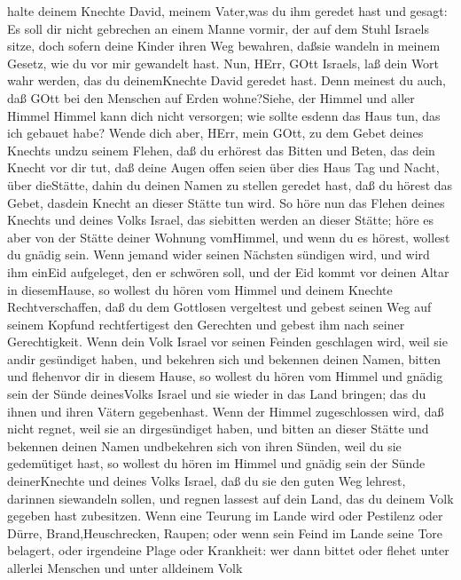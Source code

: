 halte deinem Knechte David, meinem Vater,was du ihm geredet hast und
gesagt: Es soll dir nicht gebrechen an einem Manne vormir, der auf dem
Stuhl Israels sitze, doch sofern deine Kinder ihren Weg bewahren, daßsie
wandeln in meinem Gesetz, wie du vor mir gewandelt hast. 
Nun, HErr, GOtt Israels, laß dein Wort wahr werden, das du deinemKnechte
David geredet hast.  Denn meinest du auch, daß GOtt bei den
Menschen auf Erden wohne?Siehe, der Himmel und aller Himmel Himmel kann
dich nicht versorgen; wie sollte esdenn das Haus tun, das ich gebauet
habe?  Wende dich aber, HErr, mein GOtt, zu dem Gebet
deines Knechts undzu seinem Flehen, daß du erhörest das Bitten und
Beten, das dein Knecht vor dir tut,  daß deine Augen offen
seien über dies Haus Tag und Nacht, über dieStätte, dahin du deinen
Namen zu stellen geredet hast, daß du hörest das Gebet, dasdein Knecht
an dieser Stätte tun wird.  So höre nun das Flehen deines
Knechts und deines Volks Israel, das siebitten werden an dieser Stätte;
höre es aber von der Stätte deiner Wohnung vomHimmel, und wenn du es
hörest, wollest du gnädig sein.  Wenn jemand wider seinen
Nächsten sündigen wird, und wird ihm einEid aufgeleget, den er schwören
soll, und der Eid kommt vor deinen Altar in diesemHause, 
so wollest du hören vom Himmel und deinem Knechte Rechtverschaffen, daß
du dem Gottlosen vergeltest und gebest seinen Weg auf seinem Kopfund
rechtfertigest den Gerechten und gebest ihm nach seiner Gerechtigkeit.
 Wenn dein Volk Israel vor seinen Feinden geschlagen wird,
weil sie andir gesündiget haben, und bekehren sich und bekennen deinen
Namen, bitten und flehenvor dir in diesem Hause,  so
wollest du hören vom Himmel und gnädig sein der Sünde deinesVolks Israel
und sie wieder in das Land bringen; das du ihnen und ihren Vätern
gegebenhast.  Wenn der Himmel zugeschlossen wird, daß nicht
regnet, weil sie an dirgesündiget haben, und bitten an dieser Stätte und
bekennen deinen Namen undbekehren sich von ihren Sünden, weil du sie
gedemütiget hast,  so wollest du hören im Himmel und gnädig
sein der Sünde deinerKnechte und deines Volks Israel, daß du sie den
guten Weg lehrest, darinnen siewandeln sollen, und regnen lassest auf
dein Land, das du deinem Volk gegeben hast zubesitzen. 
Wenn eine Teurung im Lande wird oder Pestilenz oder Dürre,
Brand,Heuschrecken, Raupen; oder wenn sein Feind im Lande seine Tore
belagert, oder irgendeine Plage oder Krankheit:  wer dann
bittet oder flehet unter allerlei Menschen und unter alldeinem Volk
